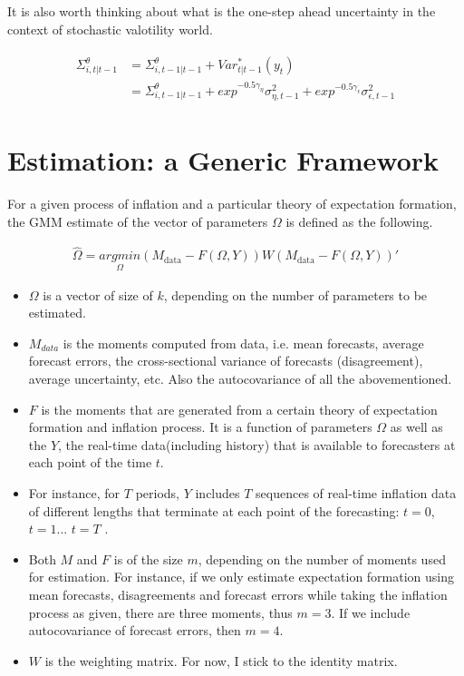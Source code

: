 \documentclass[]{article}
\begin{document}
It is also worth thinking about what is the one-step ahead uncertainty in the context of stochastic valotility world. 


\begin{eqnarray}
\begin{split}
\Sigma^\theta_{i,t|t-1} & = \Sigma^\theta_{i,t-1|t-1} + Var^*_{t|t-1}(y_t) \\
& = \Sigma^\theta_{i,t-1|t-1} +  exp^{- 0.5\gamma_{\eta}} \sigma^2_{\eta,t-1}  +  exp^{- 0.5\gamma_{\epsilon}} \sigma^2_{\epsilon,t-1} 
\end{split}
\end{eqnarray}


\section{Estimation: a Generic Framework}

For a given process of inflation and a particular theory of expectation formation, the GMM estimate of the vector of parameters $\Omega$ is defined as the following. 

\begin{eqnarray}
\widehat \Omega = \underset{\Omega }{argmin} (M_{\textrm{data} } - F(\Omega, Y)) W  (M_{\textrm{data} } - F(\Omega, Y))'
\end{eqnarray}

\begin{itemize}
	\item  $\Omega$ is a vector of size of $k$, depending on the number of parameters to be estimated. 
	\item $M_{data}$ is the moments computed from data, i.e. mean forecasts, average forecast errors, the cross-sectional variance of forecasts (disagreement), average uncertainty, etc. Also the autocovariance of all the abovementioned.  
	\item $F$ is the moments that are generated from a certain theory of expectation formation and inflation process. It is a function of parameters $\Omega$ as well as the $Y$, the real-time data(including history) that is available to forecasters at each point of the time $t$. 
	\item For instance, for $T$ periods, $Y$ includes $T$  sequences of real-time inflation data of different lengths that terminate at each point of the forecasting:  $t =0$, $t=1$... $t=T$ . 
	\item  Both $M$ and $F$ is of the size  $m$, depending on the number of moments used for estimation. For instance, if we only estimate expectation formation using mean forecasts, disagreements and forecast errors while taking the inflation process as given, there are three moments, thus $m = 3$. If we include autocovariance of forecast errors, then $m=4$.  
	
	\item $W$ is the weighting matrix. For now, I stick to the identity matrix. 
\end{itemize}
\end{document}
